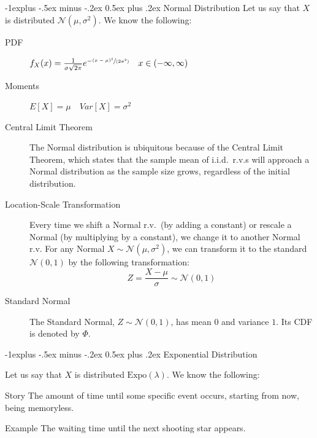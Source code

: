 \documentclass[10pt,landscape]{article}
\makeatletter
\newcommand{\N}{\mathcal{N}}
\newcommand{\Expo}{\textrm{Expo}}
\renewcommand{\subsection}{\@startsection{subsection}{2}{0mm}%
                                {-1explus -.5ex minus -.2ex}%
                                {0.5ex plus .2ex}%
                                {\normalfont\normalsize\bfseries}}
\makeatother
\begin{document}
\begin{multicols*}{3}
\begin{description}
												
												    
	\end{description}
									
	\subsection{Normal Distribution} Let us say that $X$ is distributed $\N(\mu, \sigma^2)$. We know the following:
	\begin{description}
		\item[PDF] $f_X(x) = \frac{1}{\sigma \sqrt{2\pi}} e^{-\sfrac{(x - \mu)^2}{(2 \sigma^2)}} \quad x \in (-\infty, \infty)$ 
		\item[Moments] $E[X]=\mu \quad Var[X] = \sigma^2$
		\item[Central Limit Theorem] The Normal distribution is ubiquitous because of the Central Limit Theorem, which states that the sample mean of i.i.d.~r.v.s will approach a Normal distribution as the sample size grows, regardless of the initial distribution.
		\item[Location-Scale Transformation] Every time we shift a Normal r.v.~(by adding a constant) or rescale a Normal (by multiplying by a constant), we change it to another Normal r.v. For any Normal $X \sim \N(\mu, \sigma^2)$, we can transform it to the standard $\N(0, 1)$ by the following transformation:
		\[Z= \frac{X - \mu}{\sigma} \sim \N(0, 1) \]
		\item[Standard Normal] The Standard Normal, $Z \sim \N(0, 1)$, has mean $0$ and variance $1$. Its CDF is denoted by $\Phi$.
	\end{description}
									
	\subsection{Exponential Distribution}
									
	Let us say that $X$ is distributed $\Expo(\lambda)$. We know the following:
	\begin{description}
		\item{Story} The amount of time until some specific event occurs, starting from now, being memoryless. \item{Example} The waiting time until the next shooting star appears.
												    

\end{description}
\end{multicols*}
\end{document}
